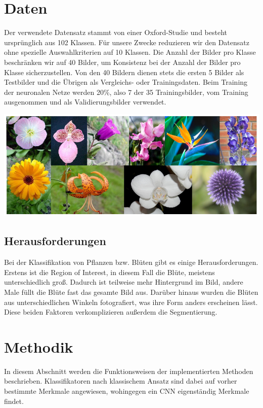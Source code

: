 \documentclass[11pt,a4paper]{article}
\begin{document}
\section{Daten}
Der verwendete Datensatz stammt von einer Oxford-Studie und besteht ursprünglich aus 102 Klassen. Für unsere Zwecke reduzieren wir den Datensatz ohne spezielle Auswahlkriterien auf 10 Klassen. Die Anzahl der Bilder pro Klasse beschränken wir auf 40 Bilder, um Konsistenz bei der Anzahl der Bilder pro Klasse sicherzustellen. Von den 40 Bildern dienen stets die ersten 5 Bilder als Testbilder und die Übrigen als Vergleichs- oder Trainingsdaten. Beim Training der neuronalen Netze werden 20\%, also 7 der 35 Trainingsbilder, vom Training ausgenommen und als Validierungsbilder verwendet.
\\

\begin{minipage}{.9\linewidth}
\begin{center}
	\includegraphics[scale=.46]{examples2.png}
\end{center}
\end{minipage}

\subsection{Herausforderungen}
Bei der Klassifikation von Pflanzen bzw. Blüten gibt es einige Herausforderungen. Erstens ist die Region of Interest, in diesem Fall die Blüte, meistens unterschiedlich groß. Dadurch ist teilweise mehr Hintergrund im Bild, andere Male füllt die Blüte fast das gesamte Bild aus. Darüber hinaus wurden die Blüten aus unterschiedlichen Winkeln fotografiert, was ihre Form anders erscheinen lässt. Diese beiden Faktoren verkomplizieren außerdem die Segmentierung.

\section{Methodik}
In diesem Abschnitt werden die Funktionsweisen der implementierten Methoden beschrieben. Klassifikatoren nach klassischem Ansatz sind dabei auf vorher bestimmte Merkmale angewiesen, wohingegen ein CNN eigenständig Merkmale findet.
\end{document}
